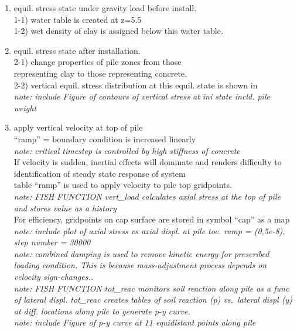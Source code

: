 \documentclass[a4paper, nobind]{templates/ociamthesis}
\providecommand{\tightlist}{%
  \setlength{\itemsep}{0pt}\setlength{\parskip}{0pt}}
\begin{document}
\begin{enumerate}
\def\labelenumi{\arabic{enumi})}
\tightlist
\item
  equil. stress state under gravity load before install.\\
  1-1) water table is created at z=5.5\\
  1-2) wet density of clay is assigned below this water table.\\
\item
  equil. stress state after installation.\\
  2-1) change properties of pile zones from those\\
  representing clay to those representing concrete.\\
  2-2) vertical equil. stress distribution at this equil. state is shown in\\
  \emph{note: include Figure of contours of vertical stress at ini state incld. pile weight}\\
\item
  apply vertical velocity at top of pile\\
  ``ramp'' = boundary condition is increased linearly\\
  \emph{note: critical timestep is controlled by high stiffness of concrete}\\
  If velocity is sudden, inertial effects will dominate and renders difficulty to identification of steady state response of system\\
  table ``ramp'' is used to apply velocity to pile top gridpoints.\\
  \emph{note: FISH FUNCTION vert\_load calculates axial stress at the top of pile and stores value as a history}\\
  For efficiency, gridpoints on cap surface are stored in symbol ``cap'' as a map\\
  \emph{note: include plot of axial stress vs axial displ. at pile toe. ramp = (0,5e-8), step number = 30000}\\
  \emph{note: combined damping is used to remove kinetic energy for prescribed loading condition. This is because mass-adjustment process depends on velocity sign-changes..}\\
  \emph{note: FISH FUNCTION tot\_reac monitors soil reaction along pile as a func of lateral displ. tot\_reac creates tables of soil reaction (p) vs.~lateral displ (y) at diff. locations along pile to generate p-y curve.}\\
  \emph{note: include Figure of p-y curve at 11 equidistant points along pile}\\
\end{enumerate}
\end{document}
